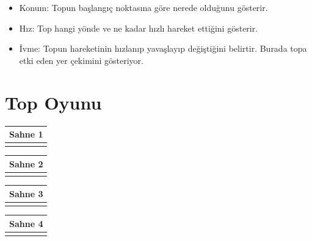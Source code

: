 \documentclass[12pt, a4paper]{article}
\begin{document}
\begin{itemize}
 \item Konum: Topun başlangıç noktasına göre nerede olduğunu gösterir.
 \item Hız: Top hangi yönde ve ne kadar hızlı hareket ettiğini gösterir.
 
 \item İvme: Topun hareketinin hızlanıp yavaşlayıp değiştiğini belirtir. Burada topa etki eden yer çekimini gösteriyor. 
\end{itemize}










\newpage

\section*{Top Oyunu}
 
\noindent
{}

\begin{tabular}{| p{16.5cm}  |  }
\hline			
Sahne 1\\
\hline
 \\[50ex]
\hline  
\end{tabular}

\vspace{5ex}
\noindent
\begin{tabular}{| p{16.5cm}  |  }
\hline			
Sahne 2\\
\hline
 \\[50ex]
\hline  
\end{tabular}

\vspace{5ex}
\noindent
\begin{tabular}{| p{16.5cm}  |  }
\hline			
Sahne 3\\
\hline
 \\[50ex]
\hline  
\end{tabular}

\vspace{5ex}
\noindent
\begin{tabular}{| p{16.5cm}  |  }
\hline			
Sahne 4\\
\hline
 \\[50ex]
\hline  
\end{tabular}
\end{document}
